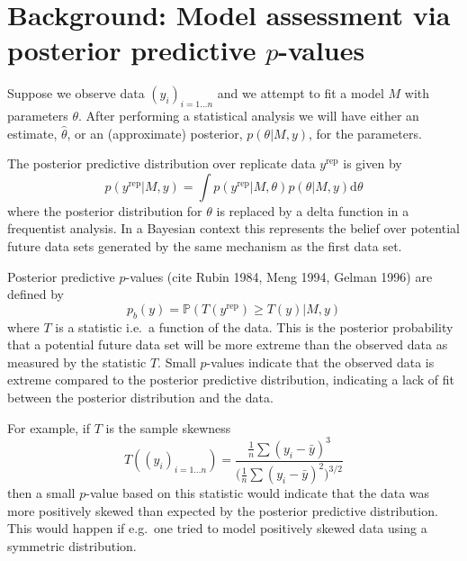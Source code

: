 \documentclass{article}
\def\ie{i.e.\ }
\def\eg{e.g.\ }
\begin{document}
\section{Background: Model assessment via posterior predictive $p$-values}

Suppose we observe data $(y_i)_{i=1\ldots n}$ and we attempt to fit a model $M$ with parameters $\theta$.
After performing a statistical analysis we will have either an estimate, $\hat\theta$, or an (approximate) posterior, $p(\theta|M,y)$, for the parameters.

The posterior predictive distribution over replicate data $y^\textrm{rep}$ is given by
\begin{equation}
p(y^\textrm{rep}|M,y) = \int p(y^\textrm{rep}|M,\theta)p(\theta|M,y)\mathrm{d}\theta
\end{equation}
where the posterior distribution for $\theta$ is replaced by a delta function in a frequentist analysis.
In a Bayesian context this represents the belief over potential future data sets generated by the same mechanism as the first data set.

Posterior predictive $p$-values (cite Rubin 1984, Meng 1994, Gelman 1996) are defined by
\begin{equation}
p_b(y) = \mathbb{P}(T(y^\textrm{rep})\geq T(y)|M,y)
\end{equation}
where $T$ is a statistic \ie a function of the data.
This is the posterior probability that a potential future data set will be more extreme than the observed data as measured by the statistic $T$.
Small $p$-values indicate that the observed data is extreme compared to the posterior predictive distribution, indicating a lack of fit between the posterior distribution and the data.


For example, if $T$ is the sample skewness 
\begin{equation}
T((y_i)_{i=1\ldots n}) = \frac{\frac{1}{n}\sum (y_i-\bar y)^3}{\big(\frac{1}{n}\sum (y_i- \bar y)^2\big)^{3/2}}
\end{equation}
then a small $p$-value based on this statistic would indicate that the data was more positively skewed than expected by the posterior predictive distribution.
This would happen if \eg one tried to model positively skewed data using a symmetric distribution.
\end{document}
